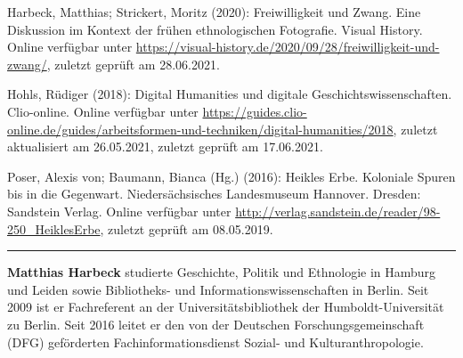 \documentclass[a4paper,
fontsize=11pt,
oneside,
numbers=noperiodatend,
parskip=half-,
bibliography=totoc,
final
]{scrartcl}
\begin{document}
Harbeck, Matthias; Strickert, Moritz (2020): Freiwilligkeit und Zwang.
Eine Diskussion im Kontext der frühen ethnologischen Fotografie. Visual
History. Online verfügbar unter
\url{https://visual-history.de/2020/09/28/freiwilligkeit-und-zwang/},
zuletzt geprüft am 28.06.2021.

Hohls, Rüdiger (2018): Digital Humanities und digitale
Geschichtswissenschaften. Clio-online. Online verfügbar unter
\url{https://guides.clio-online.de/guides/arbeitsformen-und-techniken/digital-humanities/2018},
zuletzt aktualisiert am 26.05.2021, zuletzt geprüft am 17.06.2021.

Poser, Alexis von; Baumann, Bianca (Hg.) (2016): Heikles Erbe. Koloniale
Spuren bis in die Gegenwart. Niedersächsisches Landesmuseum Hannover.
Dresden: Sandstein Verlag. Online verfügbar unter
\url{http://verlag.sandstein.de/reader/98-250_HeiklesErbe}, zuletzt
geprüft am 08.05.2019.

\begin{center}\rule{0.5\linewidth}{0.5pt}\end{center}

\textbf{Matthias Harbeck} studierte Geschichte, Politik und Ethnologie
in Hamburg und Leiden sowie Bibliotheks- und Informationswissenschaften
in Berlin. Seit 2009 ist er Fachreferent an der Universitätsbibliothek
der Humboldt-Universität zu Berlin. Seit 2016 leitet er den von der
Deutschen Forschungsgemeinschaft (DFG) geförderten
Fachinformationsdienst Sozial- und Kulturanthropologie.
\end{document}
